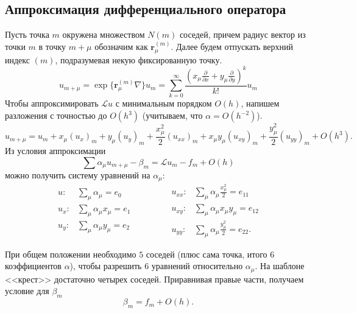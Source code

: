 \documentclass[12pt]{article}
\renewcommand{\vec}[1]{\boldsymbol{\mathbf{#1}}}
\newcommand{\pd}[2]{\frac{\partial{#1}}{\partial {#2}}}
\begin{document}
\subsection{Аппроксимация дифференциального оператора}
Пусть точка $m$ окружена множеством $N(m)$ соседей, причем радиус вектор из точки $m$ в точку $m + \mu$ обозначим как $\vec r_\mu^{(m)}$. Далее будем отпускать верхний индекс $(m)$, подразумевая некую фиксированную точку.
\[u_{m+\mu} = \exp\{\vec r_{\mu}^{(m)}\nabla\} u_m = 
\sum_{k=0}^\infty \frac{\left(x_\mu\pd{}{x} + y_\mu\pd{}{y}\right)^k}{k!} u_m
\]
Чтобы аппроксимировать $\mathcal{L}u$ с минимальным порядком $O(h)$, напишем разложения с точностью до $O(h^3)$ (учитываем, что $\alpha = O(h^{-2})$).
\[
u_{m+\mu} = u_m +
x_\mu (u_x)_m + y_\mu (u_y)_m + 
\frac{x_\mu^2}{2} (u_{xx})_m +
x_\mu y_\mu (u_{xy})_m +
\frac{y_\mu^2}{2} (u_{yy})_m + O(h^3).
\]
Из условия аппроксимации
\[
\sum \alpha_\mu u_{m+\mu} - \beta_m = \mathcal{L} u_m - f_m + O(h)
\]
можно получить систему уравнений на $\alpha_\mu$:
\[
\begin{aligned}
u: &\sum_\mu \alpha_\mu = e_0\\
u_x: &\sum_\mu \alpha_\mu x_\mu = e_1\\
u_y: &\sum_\mu \alpha_\mu y_\mu = e_2
\end{aligned}
\qquad\qquad
\begin{aligned}
u_{xx}: &\sum_\mu \alpha_\mu \frac{x_\mu^2}{2} = e_{11}\\
u_{xy}: &\sum_\mu \alpha_\mu x_\mu y_\mu = e_{12}\\
u_{yy}: &\sum_\mu \alpha_\mu \frac{y_\mu^2}{2} = e_{22}.
\end{aligned}
\]

При общем положении необходимо $5$ соседей (плюс сама точка, итого $6$ коэффициентов $\alpha$), чтобы разрешить 6 уравнений относительно $\alpha_\mu$. На шаблоне <<крест>> достаточно четырех соседей. Приравнивая правые части, получаем условие для $\beta_m$
\[
\beta_m = f_m + O(h).
\]
\end{document}
